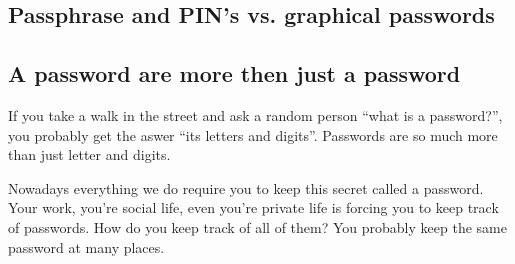   \subsection{Passphrase and PIN's vs. graphical passwords}

  \subsection{A password are more then just a password}

    If you take a walk in the street and ask a random person ``what is a password?'', 
    you probably get the aswer ``its letters and digits''. Passwords are so much more than just letter and digits. 

    Nowadays everything we do require you to keep this secret called a password. Your work, you're social life, 
    even you're private life is forcing you to keep track of passwords. How do you keep track of all of them?
    You probably keep the same password at many places. 


 \cite{Uellenbeck} 